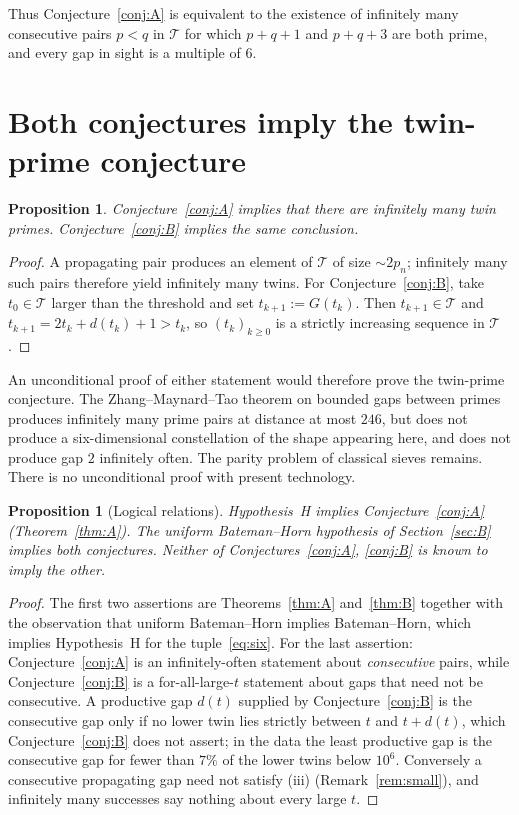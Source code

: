 \documentclass[11pt,a4paper]{article}
\newtheorem{proposition}[theorem]{Proposition}
\theoremstyle{definition}
\theoremstyle{remark}
\newcommand{\T}{\mathcal{T}}
\begin{document}
Thus Conjecture~\ref{conj:A} is equivalent to the existence of infinitely many consecutive pairs $p<q$ in $\T$ for which $p+q+1$ and $p+q+3$ are both prime, and every gap in sight is a multiple of $6$.

\section{Both conjectures imply the twin-prime conjecture}\label{sec:tpc}

\begin{proposition}\label{prop:tpc}
Conjecture~\ref{conj:A} implies that there are infinitely many twin primes.
Conjecture~\ref{conj:B} implies the same conclusion.
\end{proposition}

\begin{proof}
A propagating pair produces an element of $\T$ of size $\sim 2p_n$; infinitely many such pairs therefore yield infinitely many twins.
For Conjecture~\ref{conj:B}, take $t_0\in\T$ larger than the threshold and set $t_{k+1} := G(t_k)$.
Then $t_{k+1}\in\T$ and $t_{k+1} = 2t_k + d(t_k) + 1 > t_k$, so $(t_k)_{k\ge0}$ is a strictly increasing sequence in $\T$.
\end{proof}

An unconditional proof of either statement would therefore prove the twin-prime conjecture.
The Zhang--Maynard--Tao theorem on bounded gaps between primes \cite{Zhang,Maynard,Polymath} produces infinitely many prime pairs at distance at most $246$, but does not produce a six-dimensional constellation of the shape appearing here, and does not produce gap $2$ infinitely often.
The parity problem of classical sieves remains. There is no unconditional proof with present technology.

\begin{proposition}[Logical relations]\label{prop:relations}
Hypothesis~H implies Conjecture~\ref{conj:A} (Theorem~\ref{thm:A}).
The uniform Bateman--Horn hypothesis of Section~\ref{sec:B} implies both conjectures.
Neither of Conjectures~\ref{conj:A}, \ref{conj:B} is known to imply the other.
\end{proposition}

\begin{proof}
The first two assertions are Theorems~\ref{thm:A} and~\ref{thm:B} together with the observation that uniform Bateman--Horn implies Bateman--Horn, which implies Hypothesis~H for the tuple~\eqref{eq:six}.
For the last assertion: Conjecture~\ref{conj:A} is an infinitely-often statement about \emph{consecutive} pairs, while Conjecture~\ref{conj:B} is a for-all-large-$t$ statement about gaps that need not be consecutive.
A productive gap $d(t)$ supplied by Conjecture~\ref{conj:B} is the consecutive gap only if no lower twin lies strictly between $t$ and $t+d(t)$, which Conjecture~\ref{conj:B} does not assert; in the data the least productive gap is the consecutive gap for fewer than $7\%$ of the lower twins below $10^6$.
Conversely a consecutive propagating gap need not satisfy (iii) (Remark~\ref{rem:small}), and infinitely many successes say nothing about every large $t$.
\end{proof}
\end{document}
